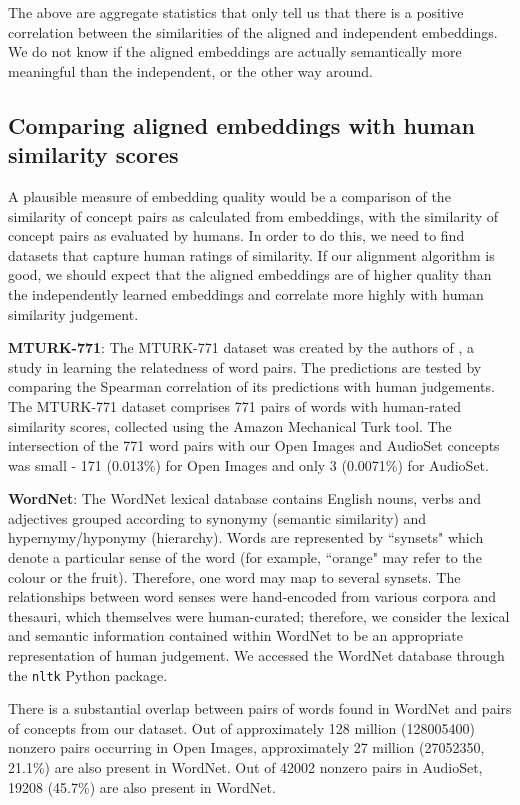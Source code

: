 The above are aggregate statistics that only tell us that there is a positive correlation between the similarities of the aligned and independent embeddings. We do not know if the aligned embeddings are actually semantically more meaningful than the independent, or the other way around. 

\subsection{Comparing aligned embeddings with human similarity scores}

A plausible measure of embedding quality would be a comparison of the similarity of concept pairs as calculated from embeddings, with the similarity of concept pairs as evaluated by humans. In order to do this, we need to find datasets that capture human ratings of similarity. If our alignment algorithm is good, we should expect that the aligned embeddings are of higher quality than the independently learned embeddings and correlate more highly with human similarity judgement. 

\textbf{MTURK-771}: The MTURK-771 dataset was created by the authors of \cite{mturk771}, a study in learning the relatedness of word pairs. The predictions are tested by comparing the Spearman correlation of its predictions with human judgements. The MTURK-771 dataset comprises 771 pairs of words with human-rated similarity scores, collected using the Amazon Mechanical Turk tool. The intersection of the 771 word pairs with our Open Images and AudioSet concepts was small - 171 (0.013\%)  for Open Images and only 3 (0.0071\%) for AudioSet. 

\textbf{WordNet}: The WordNet \cite{WordNet} lexical database contains English nouns, verbs and adjectives grouped according to synonymy (semantic similarity) and hypernymy/hyponymy (hierarchy). Words are represented by ``synsets" which denote a particular sense of the word (for example, ``orange" may refer to the colour or the fruit). Therefore, one word may map to several synsets. The relationships between word senses were hand-encoded from various corpora and thesauri, which themselves were human-curated; therefore, we consider the lexical and semantic information contained within WordNet to be an appropriate representation of human judgement. We accessed the WordNet database through the \texttt{nltk} Python package. 

There is a substantial overlap between pairs of words found in WordNet and pairs of concepts from our dataset.  Out of approximately 128 million (128005400) nonzero pairs occurring in Open Images, approximately 27 million (27052350, 21.1\%) are also present in WordNet. Out of 42002 nonzero pairs in AudioSet, 19208 (45.7\%) are also present in WordNet. 

